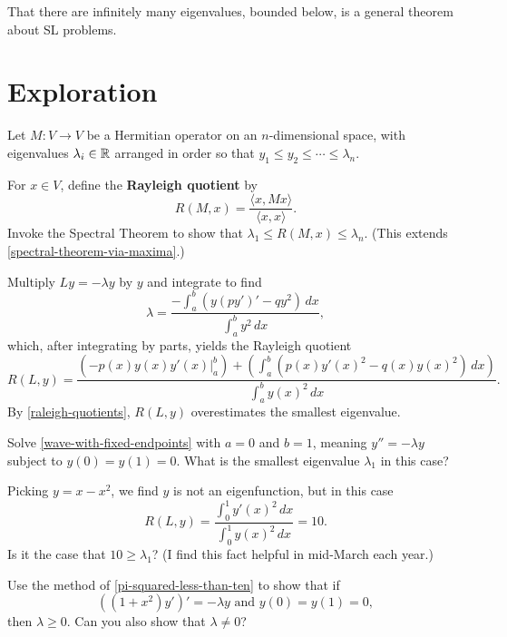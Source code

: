 \documentclass{homework}
\begin{document}
\begin{solution}
  That there are infinitely many eigenvalues, bounded below, is a
  general theorem about SL problems.
\end{solution}

\section{Exploration}

\begin{problem}\label{raleigh-quotients}Let $M : V \to V$ be a Hermitian operator on an $n$-dimensional
  space, with eigenvalues $\lambda_i \in \mathbb{R}$ arranged in order so that
  $y_1 \leq y_2 \leq \cdots \leq \lambda _n$.

  For $x \in V$, define the \textbf{Rayleigh quotient} by
  \[R(M,x)=\frac{\langle x, Mx \rangle}{\langle x, x \rangle}.\]
  Invoke the Spectral Theorem to show that
  $\lambda_1 \leq R(M,x) \leq \lambda_n$.  (This extends
  \ref{spectral-theorem-via-maxima}.)
\end{problem}

\begin{problem}\label{pi-squared-less-than-ten}Multiply $Ly = -\lambda y$ by $y$ and integrate to find
  \[
    \lambda = \frac{ -\displaystyle\int_a^b \left( y (p y')' - q y^2  \right) \, dx }{\displaystyle\int_a^b y^2 \, dx},
  \]
  which, after integrating by parts, yields the Rayleigh quotient
  \[
    R(L,y) =  {\frac {\left(\left.-p(x)y(x)y'(x)\right|_{a}^{b}\right)+\left(\displaystyle\int _{a}^{b}\left(p(x)y'(x)^{2}-q(x)y(x)^{2}\right)\,dx\right)}{\displaystyle\int _{a}^{b}{y(x)^{2}}\,dx}}.
  \]
  By \ref{raleigh-quotients}, $R(L,y)$ overestimates the smallest eigenvalue.

  Solve \ref{wave-with-fixed-endpoints} with $a = 0$ and $b = 1$, meaning $y'' = -\lambda y$ subject to $y(0) = y(1) = 0$.  What is the smallest eigenvalue $\lambda_1$ in this case?

  Picking $y = x - x^2$, we find $y$ is not an eigenfunction, but in this case
  \[
   R(L,y) = \frac{\displaystyle\int_0^1 y'(x)^2 \, dx}{\displaystyle\int _{0}^{1}{y(x)^{2}}\,dx} = 10.
 \]
 Is it the case that $10 \geq \lambda_1$?  (I find this fact helpful in mid-March each year.)
\end{problem}

\begin{problem}
  Use the method of \ref{pi-squared-less-than-ten} to show that if
  \[
    \left( (1+x^{2}) y' \right)' =  -\lambda y \mbox{ and } y(0) = y(1) = 0,
  \]
  then $\lambda \geq 0$.  Can you also show that $\lambda \neq 0$?
\end{problem}
\end{document}
